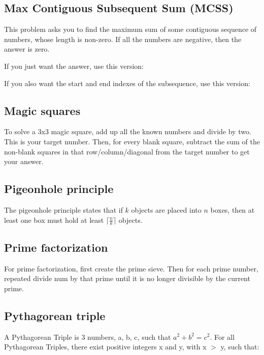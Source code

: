 

\subsection*{Max Contiguous Subsequent Sum (MCSS)}

This problem asks you to find the maximum sum of some contiguous sequence of numbers, whose length is non-zero. If all the numbers are negative, then the answer is zero.

If you just want the answer, use this version:



If you also want the start and end indexes of the subsequence, use this version:



\subsection*{Magic squares}

To solve a 3x3 magic square, add up all the known numbers and divide by two. This is your target number. Then, for every blank square, subtract the sum of the non-blank squares in that row/column/diagonal from the target number to get your answer.

\subsection*{Pigeonhole principle}

The pigeonhole principle states that if $k$ objects are placed into $n$ boxes, then at least one box must hold at least $\lceil \frac{n}{k} \rceil$ objects.

\subsection*{Prime factorization}

For prime factorization, first create the prime sieve. Then for each prime number, repeated divide num by that prime until it is no longer divisible by the current prime.

\subsection*{Pythagorean triple}

A Pythagorean Triple is 3 numbers, a, b, c, such that $a^2 + b^2 = c^2$. For all Pythagorean Triples, there exist positive integers x and y, with x $>$ y, such that:


